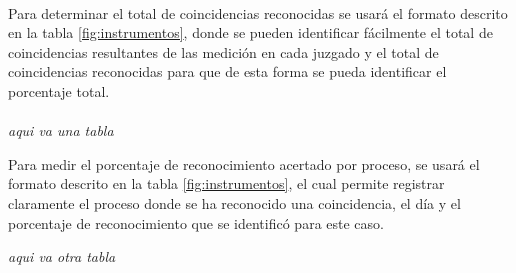 \paragraph{}
Para determinar el total de coincidencias reconocidas se usar\'a el 
formato descrito en la tabla \ref{fig:instrumentos}, donde se pueden identificar f\'acilmente 
el total de coincidencias resultantes de las medici\'on en cada juzgado y
el total de coincidencias reconocidas para que de esta forma se pueda 
identificar el porcentaje total.
\paragraph{}
\emph{aqui va una tabla}

Para medir el porcentaje de reconocimiento acertado por proceso, se 
usar\'a el formato descrito en la tabla \ref{fig:instrumentos}, el cual permite registrar 
claramente el proceso donde se ha reconocido una coincidencia, el d\'ia y
el porcentaje de reconocimiento que se identific\'o para este caso.

\emph{aqui va otra tabla}

\clearpage
\pagebreak